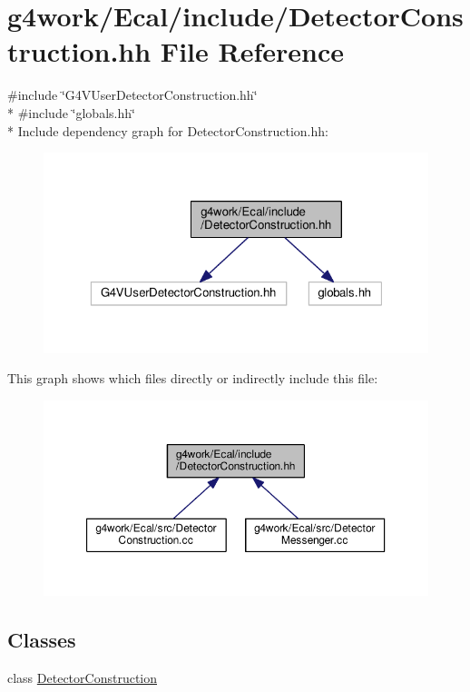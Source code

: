 \hypertarget{_detector_construction_8hh}{\section{g4work/\-Ecal/include/\-Detector\-Construction.hh File Reference}
\label{_detector_construction_8hh}
}
{\ttfamily \#include \char`\"{}G4\-V\-User\-Detector\-Construction.\-hh\char`\"{}}\\*
{\ttfamily \#include \char`\"{}globals.\-hh\char`\"{}}\\*
Include dependency graph for Detector\-Construction.\-hh\-:\nopagebreak
\begin{figure}[H]
\begin{center}
\leavevmode
\includegraphics[width=323pt]{_detector_construction_8hh__incl}
\end{center}
\end{figure}
This graph shows which files directly or indirectly include this file\-:\nopagebreak
\begin{figure}[H]
\begin{center}
\leavevmode
\includegraphics[width=350pt]{_detector_construction_8hh__dep__incl}
\end{center}
\end{figure}
\subsection*{Classes}
\begin{DoxyCompactItemize}
\item 
class \hyperlink{class_detector_construction}{Detector\-Construction}
\end{DoxyCompactItemize}
